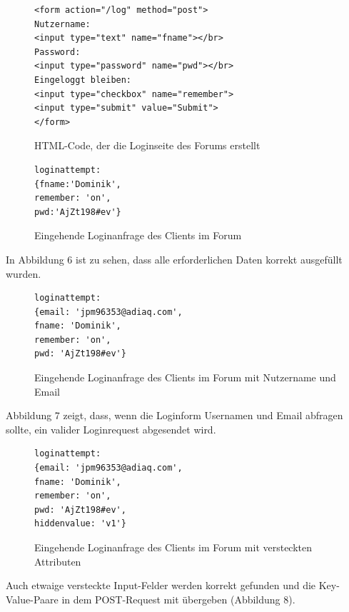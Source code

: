 \begin{figure}[ht]
\begin{lstlisting}[language=HTML5]
<form action="/log" method="post">
Nutzername: 
<input type="text" name="fname"></br>
Password: 
<input type="password" name="pwd"></br>
Eingeloggt bleiben: 
<input type="checkbox" name="remember">
<input type="submit" value="Submit">
</form>
\end{lstlisting}
\caption{HTML-Code, der die Loginseite des Forums erstellt}
\end{figure}
\newpage

\begin{figure}[h!]
\begin{lstlisting}[language=HTML5]
loginattempt: 
{fname:'Dominik',
remember: 'on',
pwd:'AjZt198#ev'}
\end{lstlisting}
\caption{Eingehende Loginanfrage des Clients im Forum}
\end{figure}

In Abbildung 6 ist zu sehen, dass alle erforderlichen Daten korrekt ausgefüllt wurden.

\begin{figure}[h!]
\begin{lstlisting}[language=HTML5]
loginattempt:
{email: 'jpm96353@adiaq.com',
fname: 'Dominik',
remember: 'on',
pwd: 'AjZt198#ev'}
\end{lstlisting}
\caption{Eingehende Loginanfrage des Clients im Forum mit Nutzername und Email}
\end{figure}
Abbildung 7 zeigt, dass, wenn die Loginform Usernamen und Email abfragen sollte, ein valider Loginrequest abgesendet wird.

\begin{figure}[h!]
\begin{lstlisting}[language=HTML5]
loginattempt:
{email: 'jpm96353@adiaq.com',
fname: 'Dominik',
remember: 'on',
pwd: 'AjZt198#ev',
hiddenvalue: 'v1'}
\end{lstlisting}
\caption{Eingehende Loginanfrage des Clients im Forum mit versteckten Attributen}
\end{figure}

Auch etwaige versteckte Input-Felder werden korrekt gefunden und die Key-Value-Paare in dem POST-Request mit übergeben (Abbildung 8).
\newpage

